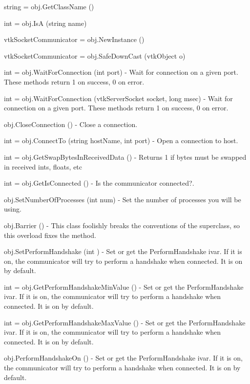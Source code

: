 \begin{DoxyItemize}
\item {\ttfamily string = obj.\-Get\-Class\-Name ()}  
\item {\ttfamily int = obj.\-Is\-A (string name)}  
\item {\ttfamily vtk\-Socket\-Communicator = obj.\-New\-Instance ()}  
\item {\ttfamily vtk\-Socket\-Communicator = obj.\-Safe\-Down\-Cast (vtk\-Object o)}  
\item {\ttfamily int = obj.\-Wait\-For\-Connection (int port)} -\/ Wait for connection on a given port. These methods return 1 on success, 0 on error.  
\item {\ttfamily int = obj.\-Wait\-For\-Connection (vtk\-Server\-Socket socket, long msec)} -\/ Wait for connection on a given port. These methods return 1 on success, 0 on error.  
\item {\ttfamily obj.\-Close\-Connection ()} -\/ Close a connection.  
\item {\ttfamily int = obj.\-Connect\-To (string host\-Name, int port)} -\/ Open a connection to host.  
\item {\ttfamily int = obj.\-Get\-Swap\-Bytes\-In\-Received\-Data ()} -\/ Returns 1 if bytes must be swapped in received ints, floats, etc  
\item {\ttfamily int = obj.\-Get\-Is\-Connected ()} -\/ Is the communicator connected?.  
\item {\ttfamily obj.\-Set\-Number\-Of\-Processes (int num)} -\/ Set the number of processes you will be using.  
\item {\ttfamily obj.\-Barrier ()} -\/ This class foolishly breaks the conventions of the superclass, so this overload fixes the method.  
\item {\ttfamily obj.\-Set\-Perform\-Handshake (int )} -\/ Set or get the Perform\-Handshake ivar. If it is on, the communicator will try to perform a handshake when connected. It is on by default.  
\item {\ttfamily int = obj.\-Get\-Perform\-Handshake\-Min\-Value ()} -\/ Set or get the Perform\-Handshake ivar. If it is on, the communicator will try to perform a handshake when connected. It is on by default.  
\item {\ttfamily int = obj.\-Get\-Perform\-Handshake\-Max\-Value ()} -\/ Set or get the Perform\-Handshake ivar. If it is on, the communicator will try to perform a handshake when connected. It is on by default.  
\item {\ttfamily obj.\-Perform\-Handshake\-On ()} -\/ Set or get the Perform\-Handshake ivar. If it is on, the communicator will try to perform a handshake when connected. It is on by default.  

\end{DoxyItemize}
